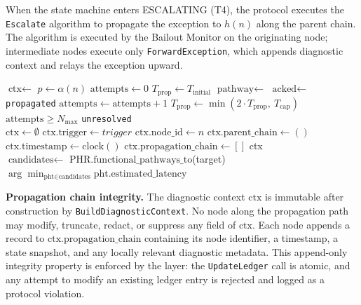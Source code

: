 When the state machine enters ESCALATING (T4), the protocol executes the \texttt{Escalate} algorithm to propagate the exception to $h(n)$ along the parent chain. The algorithm is executed by the Bailout Monitor on the originating node; intermediate nodes execute only \texttt{ForwardException}, which appends diagnostic context and relays the exception upward.

\begin{algorithm}[htbp]
\caption{Bailout Protocol escalation algorithm.}
\label{alg:escalate}
\begin{algorithmic}[1]
  \State $\text{ctx} \leftarrow$ 
  \State $p \leftarrow \alpha(n)$
  \State $\text{attempts} \leftarrow 0$
  \State $T_{\text{prop}} \leftarrow T_{\text{initial}}$
  \Repeat
    \State $\text{pathway} \leftarrow$ 
    \State $\text{acked} \leftarrow$ 
    \State {}
      \State {}
      \State \Return \texttt{propagated}
    \EndIf
    \State $\text{attempts} \leftarrow \text{attempts} + 1$
    \State $T_{\text{prop}} \leftarrow \min(2 \cdot T_{\text{prop}},\ T_{\text{cap}})$
    \State {}
  \Until $\text{attempts} \geq N_{\max}$
  \State {}
  \State {}
  \State \Return \texttt{unresolved}
\EndProcedure
\\[6pt]
  \State $\text{ctx} \leftarrow \emptyset$
  \State $\text{ctx.trigger} \leftarrow trigger$
  \State $\text{ctx.node\_id} \leftarrow n$
  \State $\text{ctx.parent\_chain} \leftarrow ()$
  \State $\text{ctx.timestamp} \leftarrow \text{clock}()$
  \State $\text{ctx.propagation\_chain} \leftarrow []$
  \State \Return ctx
\EndProcedure
\\[6pt]
  \State $\text{candidates} \leftarrow$ PHR.$\text{functional\_pathways\_to}$(target)
  \State \Return $\displaystyle\arg\min_{\text{pht}\in\text{candidates}} \text{pht.estimated\_latency}$
\EndProcedure
\end{algorithmic}
\end{algorithm}

\bigskip
\noindent\textbf{Propagation chain integrity.} The diagnostic context $\text{ctx}$ is immutable after construction by \texttt{BuildDiagnosticContext}. No node along the propagation path may modify, truncate, redact, or suppress any field of $\text{ctx}$. Each node appends a record to $\text{ctx.propagation\_chain}$ containing its node identifier, a timestamp, a state snapshot, and any locally relevant diagnostic metadata. This append-only integrity property is enforced by the \fact{} layer: the \texttt{UpdateLedger} call is atomic, and any attempt to modify an existing ledger entry is rejected and logged as a protocol violation.

